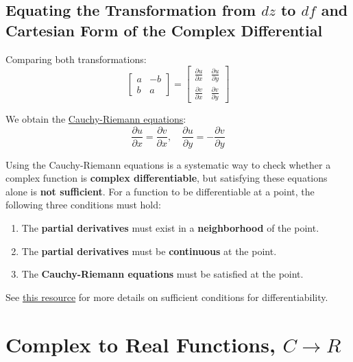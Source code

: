 \documentclass[a4paper,10.5pt]{article}
\begin{document}
\subsection{Equating the Transformation from $dz$ to $df$ and Cartesian Form of the Complex Differential}

Comparing both transformations:
\begin{equation}
\begin{bmatrix}
    a & -b \\
    b & a
\end{bmatrix} =
\begin{bmatrix}
    \frac{\partial{u}}{\partial{x}} & \frac{\partial{u}}{\partial{y}} \\
    \frac{\partial{v}}{\partial{x}} & \frac{\partial{v}}{\partial{y}}
\end{bmatrix}
\end{equation}

We obtain the \href{https://mathworld.wolfram.com/Cauchy-RiemannEquations.html}{Cauchy-Riemann equations}:
\begin{equation}
    \frac{\partial u}{\partial x} = \frac{\partial v}{\partial x}, \quad
    \frac{\partial u}{\partial y} = -\frac{\partial v}{\partial y}
\end{equation}

Using the Cauchy-Riemann equations is a systematic way to check whether a complex function is \textbf{complex differentiable}, but satisfying these equations alone is \textbf{not sufficient}. For a function to be differentiable at a point, the following three conditions must hold:

\begin{enumerate}
    \item The \textbf{partial derivatives} must exist in a \textbf{neighborhood} of the point.
    \item The \textbf{partial derivatives} must be \textbf{continuous} at the point.
    \item The \textbf{Cauchy-Riemann equations} must be satisfied at the point.
\end{enumerate}

See \href{https://complex-analysis.com/content/complex_differentiation.html}{this resource} for more details on sufficient conditions for differentiability.

\section{Complex to Real Functions, $C \rightarrow R$}
\end{document}
